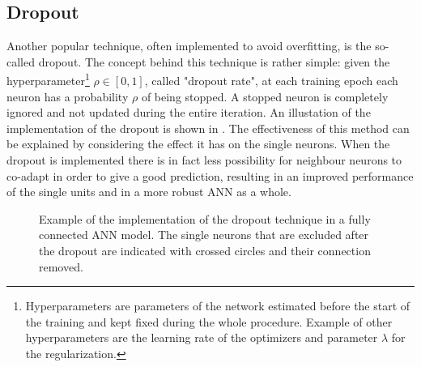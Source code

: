 \subsection{Dropout}\label{dropout}

Another popular technique, often implemented to avoid overfitting, is the so-called dropout. The concept behind this technique is rather simple: given the hyperparameter\footnote{Hyperparameters are parameters of the network estimated before the start of the training and kept fixed during the whole procedure. Example of other hyperparameters are the learning rate of the optimizers and parameter $\lambda$ for the regularization.} $\rho\in [0,1]$, called "dropout rate", at each training epoch each neuron has a probability $\rho$ of being stopped. A stopped neuron is completely ignored and not updated during the entire iteration.
An illustation of the implementation of the dropout is shown in . The effectiveness of this method can be explained by considering the effect it has on the single neurons. When the dropout is implemented there is in fact less possibility for neighbour neurons to co-adapt in order to give a good prediction, resulting in an improved performance of the single units and in a more robust ANN as a whole.

\begin{figure}
    \centering

\caption{Example of the implementation of the dropout technique in a fully connected ANN model. The single neurons that are excluded after the dropout are indicated with crossed circles and their connection removed. }
    \label{fig:dropout}
\end{figure}



